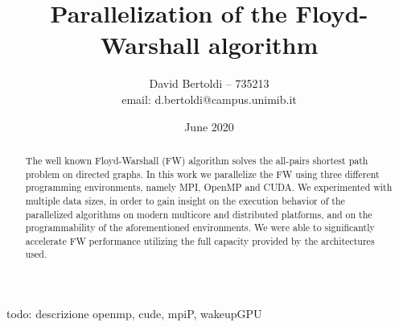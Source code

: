 \documentclass[compsoc]{IEEEtran}
\title{Parallelization of the Floyd-Warshall algorithm}
\author{David Bertoldi -- 735213 \\ email: d.bertoldi@campus.unimib.it}
\affil{Department of Informatics, Systems and Communication}
\affil{University of Milano-Bicocca}
\date{June 2020}
\begin{document}
\maketitle 



\begin{abstract}
The well known Floyd-Warshall (FW) algorithm solves the all-pairs shortest path problem on directed graphs. In this work we parallelize the FW using three different
programming environments, namely MPI, OpenMP and CUDA. We experimented with multiple data sizes, in order to gain insight on the execution behavior
of the parallelized algorithms on modern multicore and distributed platforms, and on the programmability of the aforementioned environments. We were able
to significantly accelerate FW performance utilizing the full capacity provided by the architectures used.
\end{abstract}

todo: descrizione openmp, cude, mpiP, wakeupGPU







\end{document}
